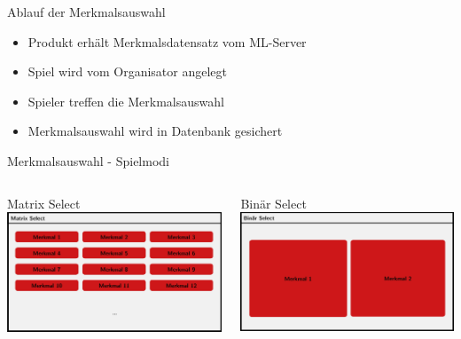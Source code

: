 \documentclass[xcolor=dvipsnames]{beamer}
\begin{document}
\begin{frame}{Ablauf der Merkmalsauswahl}
    \begin{itemize}
        \item Produkt erhält Merkmalsdatensatz vom ML-Server
        \item Spiel wird vom Organisator angelegt
        \item Spieler treffen die Merkmalsauswahl
        \item Merkmalsauswahl wird in Datenbank gesichert
    \end{itemize}
\end{frame}
\begin{frame}{Merkmalsauswahl - Spielmodi}
    \begin{columns}
        \begin{column}{0.5\textwidth}
            \begin{block}{Matrix Select}
                \includegraphics[width=\textwidth]{img/MatrixSelect_ausschnitt.jpg}
            \end{block}
        \end{column}
        \begin{column}{0.5\textwidth}  %
            \begin{block}{Binär Select}
                \includegraphics[width=\textwidth]{img/BinSelect_ausschnitt.jpg}
            \end{block}
        \end{column}
    \end{columns}
\end{frame}
\end{document}
